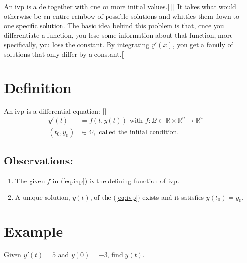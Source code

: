 \documentclass[12pt,oneside]{book}
\begin{document}
		\begin{spacing}{1.2}
			
			An \ac{ivp} is a \ac{de} together with one or more initial values.[][] It takes what would otherwise be an entire rainbow of possible solutions and whittles them down to one specific solution. The basic idea behind this problem is that, once you differentiate a function, you lose some information about that function, more specifically, you lose the constant. By integrating $ y'(x) $, you get a family of solutions that only differ by a constant.[]
			
			\section{Definition}
				An \ac{ivp} is a differential equation: []
				\begin{equation}
					\begin{split} \label{eq:ivp}
						y'(t) & = f(t, y(t)) \text{ with } f:\Omega \subset \mathbb{R} \times \mathbb{R}^n \rightarrow \mathbb{R}^n \\
						(t_{0}, y_{0}) & \in \Omega, \text{ called the initial condition.}
					\end{split}
				\end{equation}
				\subsection*{Observations: }
				\begin{enumerate}
					\item The given $ f $ in (\ref{eq:ivp}) is the defining function of \ac{ivp}.
					\item A unique solution, $ y(t) $, of the (\ref{eq:ivp}) exists and it satisfies $ y(t_{0}) = y_{0} $.
				\end{enumerate}
				
				\newpage
				
			\section*{Example}
				Given $ y'(t) = 5 $ and $ y(0) = -3 $, find $ y(t) $.

\end{spacing}
\end{document}
